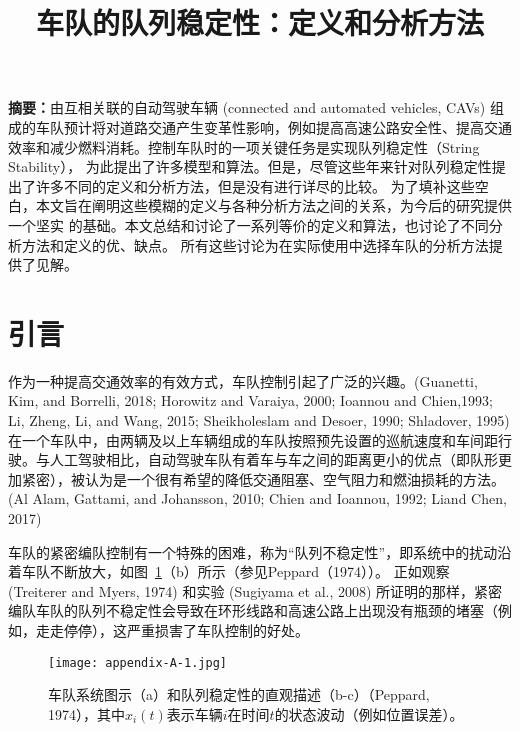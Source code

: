 
\begin{translation}
\label{cha:translation}

\title{车队的队列稳定性：定义和分析方法}
\maketitle


  \vspace{1em}
  \textbf{摘要：}由互相关联的自动驾驶车辆 (connected and automated vehicles, CAVs) 组成的车队预计将对道路交通产生变革性影响，例如提高高速公路安全性、提高交通效率和减少燃料消耗。控制车队时的一项关键任务是实现队列稳定性（String Stability），
  为此提出了许多模型和算法。但是，尽管这些年来针对队列稳定性提出了许多不同的定义和分析方法，但是没有进行详尽的比较。 为了填补这些空白，本文旨在阐明这些模糊的定义与各种分析方法之间的关系，为今后的研究提供一个坚实
  的基础。本文总结和讨论了一系列等价的定义和算法，也讨论了不同分析方法和定义的优、缺点。 所有这些讨论为在实际使用中选择车队的分析方法提供了见解。

\section{引言}

  作为一种提高交通效率的有效方式，车队控制引起了广泛的兴趣。(Guanetti, Kim, and Borrelli, 2018; Horowitz and Varaiya, 2000; Ioannou and Chien,1993; Li, Zheng, Li, and Wang, 2015; Sheikholeslam and Desoer, 1990; Shladover, 1995)
  在一个车队中，由两辆及以上车辆组成的车队按照预先设置的巡航速度和车间距行驶。与人工驾驶相比，自动驾驶车队有着车与车之间的距离更小的优点（即队形更加紧密），被认为是一个很有希望的降低交通阻塞、空气阻力和燃油损耗的方法。
  (Al Alam, Gattami, and Johansson, 2010; Chien and Ioannou, 1992; Liand Chen, 2017)
  
  车队的紧密编队控制有一个特殊的困难，称为“队列不稳定性”，即系统中的扰动沿着车队不断放大，如图~\ref{fig:appendix-translation-figure1}（b）所示（参见Peppard（1974））。 
  正如观察 (Treiterer and Myers, 1974) 和实验 (Sugiyama et al., 2008) 所证明的那样，紧密编队车队的队列不稳定性会导致在环形线路和高速公路上出现没有瓶颈的堵塞（例如，走走停停），这严重损害了车队控制的好处。

\begin{figure}
  \centering
  \texttt{[image: appendix-A-1.jpg]}
  \caption{车队系统图示（a）和队列稳定性的直观描述（b-c）（Peppard, 1974），其中$x_i(t)$表示车辆$i$在时间$t$的状态波动（例如位置误差）。}
  \label{fig:appendix-translation-figure1}
\end{figure}
   

\end{translation}
